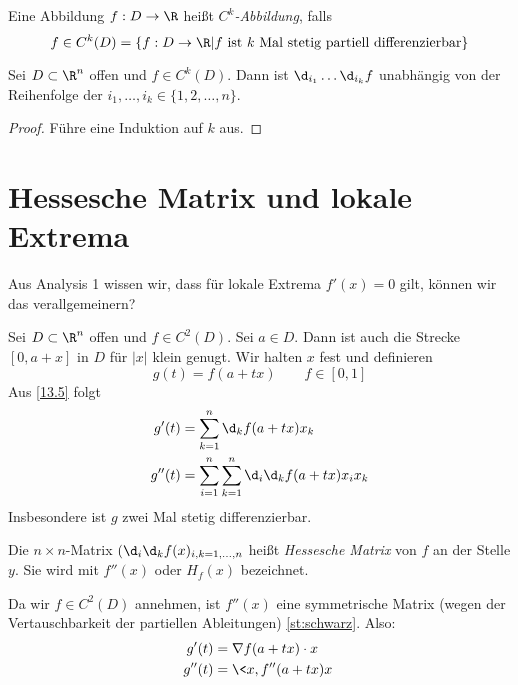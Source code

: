 \documentclass[a4paper,10pt]{scrbook}
\begin{document}
\begin{df}
	Eine Abbildung $f:D\to \R$ heißt \emph{$C^k$-Abbildung}, falls
	\[
		f \in C^k(D) = \{f:D\to \R|f \text{ ist $k$ Mal stetig partiell differenzierbar}\}
	\]
\end{df}

\begin{thm}
\label{st:schwarz}
Sei $D\subset \R^n$ offen und $f\in C^k(D)$. 
Dann ist $\d_{i_1}\dotsc\d_{i_k}f$ unabhängig von der Reihenfolge der $i_1,\dotsc,i_k\in\{1,2,\dotsc,n\}$.

\begin{proof}
Führe eine Induktion auf $k$ aus.
\end{proof}
\end{thm}

\setcounter{section}{13}
\setcounter{subsection}{5}
\section{Hessesche Matrix und lokale Extrema}

Aus Analysis 1 wissen wir, dass für lokale Extrema $f'(x)=0$ gilt, können wir das verallgemeinern?

Sei $D\subset \R^n$ offen und $f\in C^2(D)$. 
Sei $a\in D$.
Dann ist auch die Strecke $[0,a+x]$ in $D$ für $|x|$ klein genugt.
Wir halten $x$ fest und definieren
\[
g(t) = f(a+tx) \qquad f\in [0,1]
\]
Aus \ref{13.5} folgt
\begin{align*}
g'(t) &= \sum_{k=1}^n\d_kf(a+tx)x_k\\
g''(t) &= \sum_{i=1}^n\sum_{k=1}^n\d_i\d_kf(a+tx)x_ix_k
\end{align*}
Insbesondere ist $g$ zwei Mal stetig differenzierbar.

Die  $n\times n$-Matrix $(\d_i\d_kf(x)_{i,k=1,\dotsc,n}$ heißt \emph{Hessesche Matrix} von $f$ an der Stelle $y$.
Sie wird mit $f''(x)$ oder $H_f(x)$ bezeichnet.

Da wir $f\in C^2(D)$ annehmen, ist $f''(x)$ eine symmetrische Matrix (wegen der Vertauschbarkeit der partiellen Ableitungen) \ref{st:schwarz}.
Also:
\begin{align*}
g'(t) &= \nabla f(a+tx)\cdot x\\
g''(t) &= \<x,f''(a+tx)x\>
\end{align*}
\end{document}

